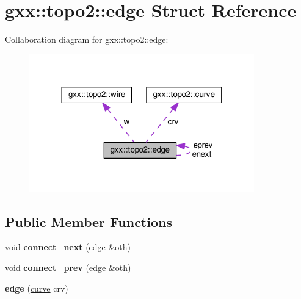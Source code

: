 \hypertarget{structgxx_1_1topo2_1_1edge}{}\section{gxx\+:\+:topo2\+:\+:edge Struct Reference}
\label{structgxx_1_1topo2_1_1edge}


Collaboration diagram for gxx\+:\+:topo2\+:\+:edge\+:
\nopagebreak
\begin{figure}[H]
\begin{center}
\leavevmode
\includegraphics[width=276pt]{structgxx_1_1topo2_1_1edge__coll__graph}
\end{center}
\end{figure}
\subsection*{Public Member Functions}
\begin{DoxyCompactItemize}
\item 
void {\bfseries connect\+\_\+next} (\hyperlink{structgxx_1_1topo2_1_1edge}{edge} \&oth)\hypertarget{structgxx_1_1topo2_1_1edge_a27277668c79607a295c45f907d6d5545}{}\label{structgxx_1_1topo2_1_1edge_a27277668c79607a295c45f907d6d5545}

\item 
void {\bfseries connect\+\_\+prev} (\hyperlink{structgxx_1_1topo2_1_1edge}{edge} \&oth)\hypertarget{structgxx_1_1topo2_1_1edge_ab1c4c200e4d86ba73ee899492a6c9f17}{}\label{structgxx_1_1topo2_1_1edge_ab1c4c200e4d86ba73ee899492a6c9f17}

\item 
{\bfseries edge} (\hyperlink{classgxx_1_1topo2_1_1curve}{curve} crv)\hypertarget{structgxx_1_1topo2_1_1edge_a6e904cc482aa3bd3aebef7d1c31669e1}{}\label{structgxx_1_1topo2_1_1edge_a6e904cc482aa3bd3aebef7d1c31669e1}

\end{DoxyCompactItemize}
